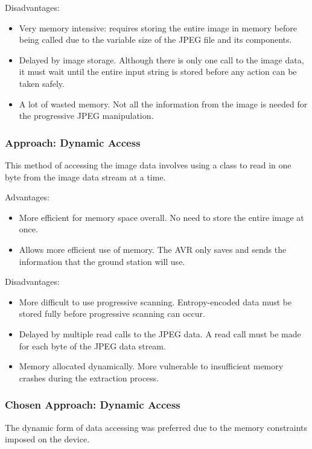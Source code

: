 Disadvantages:
\begin{itemize}
	\item Very memory intensive: requires 
		storing the entire image in memory 
		before being called due to the variable
		size of the JPEG file and its components.
	\item Delayed by image storage.
		Although there is only one call to the 
		image data, it must wait until the entire 
		input string is stored before 
		any action can be taken safely.
	\item A lot of wasted memory. 
		Not all the information 
		from the image is needed for the 
		progressive JPEG manipulation.
\end{itemize}

\subsubsection{Approach: Dynamic Access}

This method of accessing the image data 
involves using a class to read in one byte 
from the image data stream at a time.

Advantages:
\begin{itemize}
	\item More efficient for memory 
		space overall. No need to store 
		the entire image at once.
	\item Allows more efficient use of memory. 
		The AVR only saves and sends the 
		information that the ground station will use.
\end{itemize}

Disadvantages:
\begin{itemize}
	\item More difficult to use progressive scanning. 
		Entropy-encoded data must be stored fully 
		before progressive scanning can occur.
	\item Delayed by multiple read calls to the JPEG data. A 
		read call must be made for each 
		byte of the JPEG data stream.
	\item Memory allocated dynamically. 
		More vulnerable to insufficient memory 
		crashes during the extraction process.
\end{itemize}

\subsubsection{Chosen Approach: Dynamic Access}

The dynamic form of data accessing was preferred 
due to the memory constraints imposed on the device.

